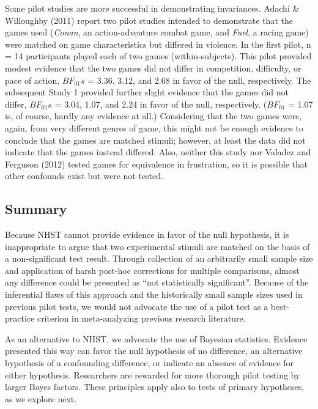 \documentclass[fignum,nobf,man]{apa}
\begin{document}
Some pilot studies are more successful in demonstrating invariances. Adachi \& Willoughby (2011) report two pilot studies intended to demonstrate that the games used (\textit{Conan}, an action-adventure combat game, and \textit{Fuel}, a racing game) were matched on game characteristics but differed in violence. In the first pilot, n = 14 participants played each of two games (within-subjects). This pilot provided modest evidence that the two games did not differ in competition, difficulty, or pace of action, $BF_{01}s$ = 3.36, 3.12, and 2.68 in favor of the null, respectively. The subsequent Study 1 provided further slight evidence that the games did not differ, $BF_{01}s$ = 3.04, 1.07, and 2.24 in favor of the null, respectively. ($BF_{01}$ = 1.07 is, of course, hardly any evidence at all.) Considering that the two games were, again, from very different genres of game, this might not be enough evidence to conclude that the games are matched stimuli; however, at least the data did not indicate that the games instead differed. Also, neither this study nor Valadez and Ferguson (2012) tested games for equivalence in frustration, so it is possible that other confounds exist but were not tested.

\subsection{Summary}
Because NHST cannot provide evidence in favor of the null hypothesis, it is inappropriate to argue that two experimental stimuli are matched on the basis of a non-significant test result. Through collection of an arbitrarily small sample size and application of harsh post-hoc corrections for multiple comparisons, almost any difference could be presented as ``not statistically significant''. Because of the inferential flaws of this approach and the historically small sample sizes used in previous pilot tests, we would not advocate the use of a pilot test as a best-practice criterion in meta-analyzing previous research literature.
 
As an alternative to NHST, we advocate the use of Bayesian statistics. Evidence presented this way can favor the null hypothesis of no difference, an alternative hypothesis of a confounding difference, or indicate an absence of evidence for either hypothesis. Researchers are rewarded for more thorough pilot testing by larger Bayes factors. These principles apply also to tests of primary hypotheses, as we explore next.
\end{document}
